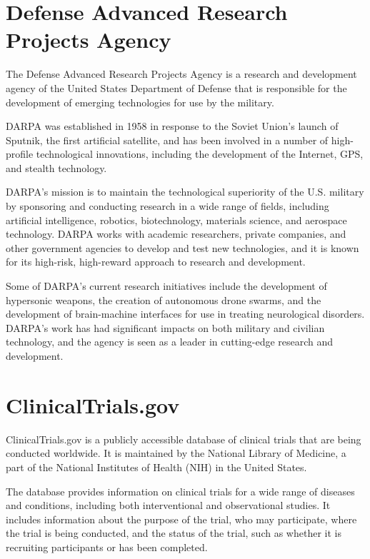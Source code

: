 \documentclass[
]{book}
\begin{document}
\hypertarget{darpa}{%
\section{Defense Advanced Research Projects Agency}\label{darpa}}

The Defense Advanced Research Projects Agency is a research and development agency of the United States Department of Defense that is responsible for the development of emerging technologies for use by the military.

DARPA was established in 1958 in response to the Soviet Union's launch of Sputnik, the first artificial satellite, and has been involved in a number of high-profile technological innovations, including the development of the Internet, GPS, and stealth technology.

DARPA's mission is to maintain the technological superiority of the U.S. military by sponsoring and conducting research in a wide range of fields, including artificial intelligence, robotics, biotechnology, materials science, and aerospace technology. DARPA works with academic researchers, private companies, and other government agencies to develop and test new technologies, and it is known for its high-risk, high-reward approach to research and development.

Some of DARPA's current research initiatives include the development of hypersonic weapons, the creation of autonomous drone swarms, and the development of brain-machine interfaces for use in treating neurological disorders. DARPA's work has had significant impacts on both military and civilian technology, and the agency is seen as a leader in cutting-edge research and development.

\hypertarget{clinicaltrials.gov}{%
\section{ClinicalTrials.gov}\label{clinicaltrials.gov}}

ClinicalTrials.gov is a publicly accessible database of clinical trials that are being conducted worldwide. It is maintained by the National Library of Medicine, a part of the National Institutes of Health (NIH) in the United States.

The database provides information on clinical trials for a wide range of diseases and conditions, including both interventional and observational studies. It includes information about the purpose of the trial, who may participate, where the trial is being conducted, and the status of the trial, such as whether it is recruiting participants or has been completed.
\end{document}
